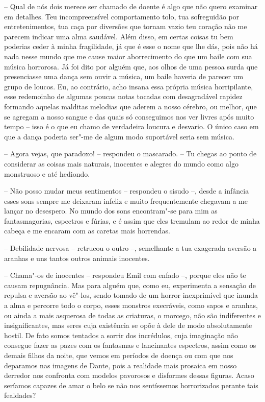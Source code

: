 -- Qual de nós dois merece ser chamado de doente é algo que não
quero examinar em detalhes. Teu incompreensível comportamento tolo, tua
sofreguidão por entretenimentos, tua caça por diversões que tornam
vazio teu coração não me parecem indicar uma alma \mbox{saudável}. Além disso,
em certas coisas tu bem poderias ceder à minha fragilidade, já que é
esse o nome que lhe dás, pois não há nada nesse mundo que me cause
maior aborrecimento do que um baile com sua música horrorosa. Já foi
dito por alguém que, aos olhos de uma pessoa surda que presenciasse uma
dança sem ouvir a música, um baile haveria de parecer um grupo de
loucos. Eu, ao contrário, acho insana essa própria música horripilante,
esse redemoinho de algumas poucas notas tocadas com desagradável
rapidez formando aquelas malditas melodias que aderem a nosso cérebro,
ou melhor, que se agregam a nosso sangue e das quais só conseguimos nos
ver livres após muito tempo -- isso é o que eu chamo de verdadeira
loucura e desvario. O único caso em que a dança poderia ser"-me de algum
modo suportável seria sem música.

-- Agora vejas, que paradoxo! -- respondeu o mascarado. -- Tu chegas ao
ponto de considerar as coisas mais naturais, inocentes e alegres do
mundo como algo monstruoso e até hediondo.

-- Não posso mudar meus sentimentos -- respondeu o sisudo --, desde a
infância esses sons sempre me deixaram infeliz e muito frequentemente
chegavam a me lançar no desespero. No mundo dos sons encontram"-se para
mim as fantasmagorias, espectros e fúrias, e é assim que eles tremulam
ao redor de minha cabeça e me encaram com as caretas mais horrendas.

-- Debilidade nervosa -- retrucou o outro --, semelhante a tua exagerada
aversão a aranhas e uns tantos outros animais inocentes.
 
-- Chama"-os de inocentes -- respondeu Emil com enfado --, porque
eles não te causam repugnância. Mas para alguém que, como eu,
experimenta a sensação de repulsa e aversão ao vê"-los, sendo tomado de
um horror inexprimível que inunda a alma e percorre todo o corpo, esses
monstros execráveis, como sapos e aranhas, ou ainda a mais asquerosa de
todas as criaturas, o morcego, não são indiferentes e insignificantes,
mas seres cuja existência se opõe à dele de modo absolutamente hostil.
De fato somos tentados a sorrir dos incrédulos, cuja imaginação não
consegue fazer as pazes com os fantasmas e lancinantes espectros, assim
como os demais filhos da noite, que vemos em períodos de doença ou com
que nos deparamos nas imagens de Dante, pois a realidade mais prosaica
em nosso derredor nos confronta com modelos pavorosos e disformes
dessas figuras. Acaso seríamos capazes de amar o belo se não nos
sentíssemos horrorizados perante tais fealdades?

